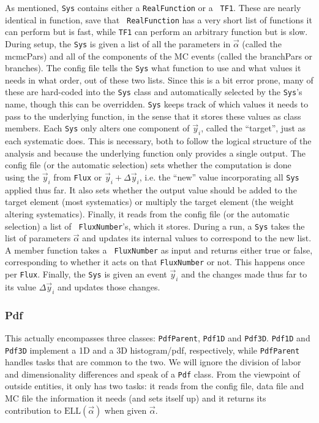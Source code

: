 As mentioned, {\tt Sys} contains either a {\tt RealFunction} or a {\tt
  TF1}.  These are nearly identical in function, save that {\tt
  RealFunction} has a very short list of functions it can perform but
is fast, while {\tt TF1} can perform an arbitrary function but is
slow.  During setup, the {\tt Sys} is given a list of all the
parameters in $\vec{\alpha}$ (called the mcmcPars) and all of the
components of the MC events (called the branchPars or branches).  The
config file tells the {\tt Sys} what function to use and what values
it needs in what order, out of these two lists.  Since this is a bit
error prone, many of these are hard-coded into the {\tt Sys} class
and automatically selected by the {\tt Sys}'s name, though this can be
overridden.  {\tt Sys} keeps track of which values it needs to pass to
the underlying function, in the sense that it stores these values as
class members.  Each {\tt Sys} only alters one component of
$\vec{y}_i$, called the ``target'', just as each systematic does.
This is necessary, both to follow the logical structure of the
analysis and because the underlying function only provides a single
output.  The config file (or the automatic selection) sets whether the
computation is done using the $\vec{y}_i$ from {\tt Flux} or
$\vec{y}_i + \Delta \vec{y}_i$, i.e. the ``new'' value incorporating
all {\tt Sys} applied thus far.  It also sets whether the output value
should be added to the target element (most systematics) or multiply
the target element (the weight altering systematics).  Finally, it
reads from the config file (or the automatic selection) a list of {\tt
  FluxNumber}'s, which it stores.  During a run, a {\tt Sys} takes the
list of parameters $\vec{\alpha}$ and updates its internal values to
correspond to the new list.  A member function takes a {\tt
  FluxNumber} as input and returns either true or false, corresponding
to whether it acts on that {\tt FluxNumber} or not.  This happens once
per {\tt Flux}.  Finally, the {\tt Sys} is given an event $\vec{y}_i$
and the changes made thus far to its value $\Delta \vec{y}_i$ and
updates those changes.


\subsubsection{Pdf}
This actually encompasses three classes: {\tt PdfParent}, {\tt Pdf1D}
and {\tt Pdf3D}.  {\tt Pdf1D} and {\tt Pdf3D} implement a 1D and a 3D
histogram/pdf, respectively, while {\tt PdfParent} handles tasks that
are common to the two.  We will ignore the division of labor and
dimensionality differences and speak of a {\tt Pdf} class.  From the
viewpoint of outside entities, it only has two tasks: it reads from
the config file, data file and MC file the information it needs (and
sets itself up) and it returns its contribution to
$\mathrm{ELL}(\vec{\alpha})$ when given $\vec{\alpha}$.

